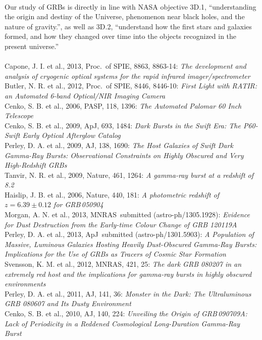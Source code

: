 \documentclass[letterpaper,11pt]{article}
\newcommand{\apj}{ApJ}%
\newcommand{\mnras}{MNRAS}
\newcommand{\aj}{AJ}
\newcommand{\pasp}{PASP}
\newcommand{\nat}{Nature}
\newcommand{\spie}{Proc.~of SPIE}
\begin{document}
\smallskip\\
Our study of GRBs is directly in line with NASA objective 3D.1, ``understanding 
the origin and destiny of the Universe, phenomenon near black holes, and the nature 
of gravity.'', as well as 3D.2, ``understand how the first stars and galaxies formed, 
and how they changed over time into the objects recognized in the present 
universe.''\\

\smallskip\\
{\footnotesize
Capone, J. I. et al., 2013, \spie, 8863, 8863-14: \textit{The development and 
analysis of cryogenic optical systems for the rapid infrared imager/spectrometer} \\
Butler, N. R. et al., 2012, \spie, 8446, 8446-10: \textit{First Light with RATIR: 
an Automated 6-band Optical/NIR Imaging Camera} \\
Cenko, S. B. et al., 2006, \pasp, 118, 1396: \textit{The Automated Palomar 
60 Inch Telescope} \\
Cenko, S. B. et al., 2009, \apj, 693, 1484: \textit{Dark Bursts in the Swift Era: 
The P60-Swift Early Optical Afterglow Catalog} \\
Perley, D. A. et al., 2009, \aj, 138, 1690: \textit{The Host Galaxies of Swift Dark 
Gamma-Ray Bursts: Observational Constraints on Highly Obscured and Very High-Redshift 
GRBs} \\
Tanvir, N. R. et al., 2009, \nat, 461, 1264: \textit{A gamma-ray burst at a redshift 
of 8.2} \\
Haislip, J. B. et al., 2006, \nat, 440, 181: \textit{A photometric redshift of 
$z = 6.39 \pm 0.12$ for GRB\,050904} \\
Morgan, A. N. et al., 2013, \mnras\ submitted (astro-ph/1305.1928): \textit{Evidence 
for Dust Destruction from the Early-time Colour Change of GRB 120119A} \\
Perley, D. A. et al., 2013, \apj\ submitted (astro-ph/1301.5903): \textit{A 
Population of Massive, Luminous Galaxies Hosting Heavily Dust-Obscured 
Gamma-Ray Bursts: Implications for the Use of GRBs as Tracers of Cosmic Star 
Formation} \\
Svensson, K. M. et al., 2012, \mnras, 421, 25: \textit{The dark GRB 080207 in an 
extremely red host and the implications for gamma-ray bursts in highly 
obscured environments} \\
Perley, D. A. et al., 2011, \aj, 141, 36: \textit{Monster in the Dark: The 
Ultraluminous GRB 080607 and Its Dusty Environment} \\
Cenko, S. B. et al., 2010, \aj, 140, 224: \textit{Unveiling the Origin of 
GRB\,090709A: Lack of Periodicity in a Reddened Cosmological Long-Duration 
Gamma-Ray Burst} \\


}
\end{document}

